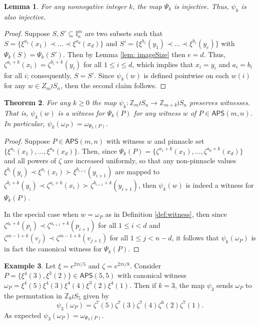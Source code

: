 \documentclass[12pt,reqno]{amsart}
\numberwithin{equation}{section}
\theoremstyle{plain}
\newtheorem{theorem}{Theorem}[section]
\newtheorem{lemma}[theorem]{Lemma}
\theoremstyle{definition}
\newtheorem{example}[theorem]{Example}
\theoremstyle{remark}
\newcommand{\Z}{\mathbb{Z}}
\newcommand{\I}{\mathbb{I}}
\newcommand\APS{\mathsf{APS}}
\begin{document}
\begin{lemma}\label{lem:injective}
For any nonnegative integer $k$, the map $\Psi_k$ is injective. Thus, $\psi_k$ is also injective. 
\end{lemma}

\begin{proof}
    Suppose $S,S' \subseteq \I^m_n$ are two subsets such that $S =\{ \xi^{a_1}(x_1)\prec \dots \prec \xi^{a_d}(x_d)\}$ and $S' =\{ \xi^{b_1}(y_1)\prec \dots \prec \xi^{b_e}(y_e)\}$ with $\Psi_k(S) = \Psi_k(S')$. Then by Lemma \ref{lem: imageSize} then $e=d$. Thus, $\zeta^{a_i+k}(x_i) = \zeta^{b_i+k}(y_i)$ for all $1\leq i \leq d$, which implies that $x_i = y_i$ and $a_i = b_i$ for all $i$; consequently, $S=S'$.
    Since $\psi_k(w)$ is defined pointwise on each $w(i)$ for any $w \in Z_m \wr S_n$, then the second claim follows. 
\end{proof}


\begin{theorem} \label{thm: witnessBiject}
    For any $k \geq 0$ the map $\psi_k: \Z_m \wr S_n \to \Z_{m+k}\wr S_n$ preserves witnesses. That is, $\psi_k(w)$ is a witness for $\Psi_k(P)$ for any witness $w$ of $P \in \APS(m,n)$. In particular, $\psi_k(\omega_P) = \omega_{\Psi_k(P)}$.
\end{theorem}

\begin{proof}
Suppose $P \in \APS(m,n)$ with  witness $w$ and pinnacle set $\{\xi^{a_1}(x_1) , \dots ,\xi^{a_d}(x_d)\}$. Then, since $\Psi_k(P)=\{ \zeta^{a_1+k}(x_1), \dots , \zeta^{a_d+k}(x_d)\}$ and all powers of $\zeta$ are increased uniformly, so that any non-pinnacle values $\xi^{b_i}(y_i) \prec \xi^{a_i}(x_i) \succ \xi^{b_{i+1}}(y_{i+1})$ are mapped to $\zeta^{b_i+k}(y_i) \prec \zeta^{a_i+k}(x_i) \succ \zeta^{b_{i+1}+k}(y_{i+1})$, then $\psi_k(w)$ is indeed a witness for $\Psi_k(P)$. 

In the special case when $w = \omega_P$ as in Definition \ref{def:witness}, then since $\zeta^{a_{i}+k}(p_{i})\prec \zeta^{a_{i+1}+k}(p_{i+1})$ for all $1\leq i <d$ and $\zeta^{m-1+k}(v_j) \prec \zeta^{m-1+k}(v_{j+1})$ for all $1\leq j <n-d$, it follows that $\psi_k(\omega_P)$ is in fact the canonical witness for $\Psi_k(P)$.
\end{proof}


\begin{example}
Let $\xi=e^{2 \pi i / 5}$ and $\zeta = e^{2\pi i/8}$. Consider $P = \{\xi^4(3), \xi^3(2)\} \in \APS(5, 5)$ with canonical witness $\omega_P = \xi^4(5)\xi^4(3)\xi^4(4)\xi^3(2)\xi^4(1)$. Then if $k=3$, the map $\psi_3$ sends $\omega_P$ to the permutation in $\Z_8 \wr S_5$ given by
\[
\psi_3(\omega_P) = \zeta^7(5)\zeta^7(3)\zeta^7(4)\zeta^6(2)\zeta^7(1).
\]
As expected $\psi_3(\omega_P)= \omega_{\Psi_3(P)}$. 

\end{example}
\end{document}
